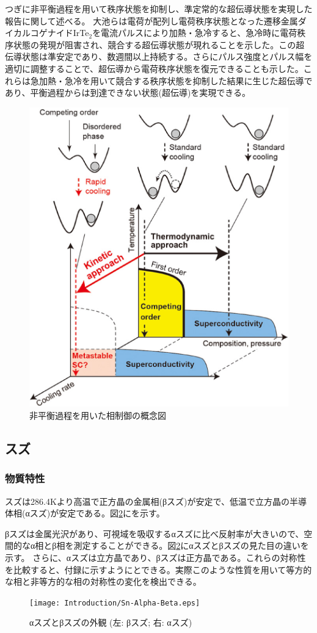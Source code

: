 つぎに非平衡過程を用いて秩序状態を抑制し、準定常的な超伝導状態を実現した報告に関して述べる。
大池らは電荷が配列し電荷秩序状態となった遷移金属ダイカルコゲナイドIrTe$_2$を電流パルスにより加熱・急冷すると、急冷時に電荷秩序状態の発現が阻害され、競合する超伝導状態が現れることを示した\cite{Oike}。この超伝導状態は準安定であり、数週間以上持続する。さらにパルス強度とパルス幅を適切に調整することで、超伝導から電荷秩序状態を復元できることも示した。これらは急加熱・急冷を用いて競合する秩序状態を抑制した結果に生じた超伝導であり、平衡過程からは到達できない状態(超伝導)を実現できる。
\begin{figure}[!h]
    \begin{center}
   \includegraphics[width=0.6\hsize]{Introduction/kinetic_approach.eps}
  \end{center}
  \caption{非平衡過程を用いた相制御の概念図}
  \label{fig:phase_diagram2}
\end{figure}


\subsection{スズ}

\subsubsection{物質特性}
スズは286.4Kより高温で正方晶の金属相(βスズ)が安定で、低温で立方晶の半導体相(αスズ)が安定である。図\ref{fig:Sn-Alpha-Beta}にを示す。

βスズは金属光沢があり、可視域を吸収するαスズに比べ反射率が大きいので、空間的なα相とβ相を測定することができる。図\ref{fig:Sn-Alpha-Beta}にαスズとβスズの見た目の違いを示す\cite{wiki}。
さらに、αスズは立方晶であり、βスズは正方晶である。これらの対称性を比較すると、付録に示すようにとできる。実際このような性質を用いて等方的な相と非等方的な相の対称性の変化を検出できる\cite{Matvienko}。
\begin{figure}[!h]
    \begin{center}
   \texttt{[image: Introduction/Sn-Alpha-Beta.eps]}
  \end{center}
  \caption{αスズとβスズの外観 (左: βスズ; 右: αスズ)}
  \label{fig:Sn-Alpha-Beta}
\end{figure}

